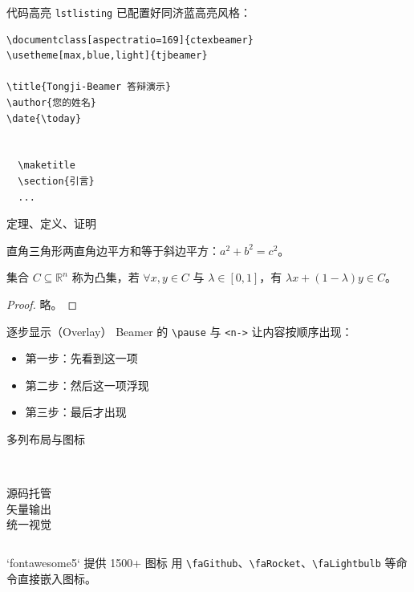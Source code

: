 \begin{frame}[fragile]{代码高亮}
  \texttt{lstlisting} 已配置好同济蓝高亮风格：
\begin{lstlisting}
\documentclass[aspectratio=169]{ctexbeamer}
\usetheme[max,blue,light]{tjbeamer}

\title{Tongji-Beamer 答辩演示}
\author{您的姓名}
\date{\today}


  \maketitle
  \section{引言}
  ...

\end{lstlisting}
\end{frame}

\begin{frame}{定理、定义、证明}
  \begin{theorem}[勾股定理]
    直角三角形两直角边平方和等于斜边平方：$a^2 + b^2 = c^2$。
  \end{theorem}
  \begin{definition}[凸集]
    集合 $C \subseteq \mathbb{R}^n$ 称为凸集，若 $\forall x, y \in C$ 与 $\lambda \in [0, 1]$，有 $\lambda x + (1-\lambda) y \in C$。
  \end{definition}
  \begin{proof}
    略。
  \end{proof}
\end{frame}

\begin{frame}{逐步显示（Overlay）}
  Beamer 的 \texttt{\textbackslash{}pause} 与 \texttt{<n->} 让内容按顺序出现：
  \begin{itemize}
    \item<1-> 第一步：先看到这一项
    \item<2-> 第二步：然后这一项浮现
    \item<3-> 第三步：最后才出现
  \end{itemize}
\end{frame}

\begin{frame}{多列布局与图标}
  \begin{columns}[T,onlytextwidth]
    \centering
    \faGithub\\[0.3em]\small 源码托管
    \centering
    \faFilePdf\\[0.3em]\small 矢量输出
    \centering
    \faPalette\\[0.3em]\small 统一视觉
  \end{columns}
  \vspace{0.8em}
  \begin{block}{`fontawesome5` 提供 1500+ 图标}
    用 \texttt{\textbackslash{}faGithub}、\texttt{\textbackslash{}faRocket}、\texttt{\textbackslash{}faLightbulb} 等命令直接嵌入图标。
  \end{block}
\end{frame}


